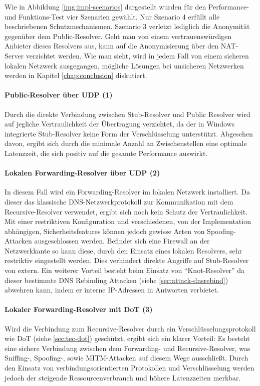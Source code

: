 Wie in Abbildung \ref{img:impl-scenarios} dargestellt wurden für den Performance- und Funktions-Test vier Szenarien gewählt. Nur Szenario 4 erfüllt alle beschriebenen Schutzmechanismen. Szenario 3 verletzt lediglich die Anonymität gegenüber dem Public-Resolver. Geht man von einem vertrauenswürdigen Anbieter dieses Resolvers aus, kann auf die Anonymisierung über den NAT-Server verzichtet werden. Wie man sieht, wird in jedem Fall von einem sicheren lokalen Netzwerk ausgegangen, mögliche Lösungen bei unsicheren Netzwerken werden in Kapitel \ref{chap:conclusion} diskutiert. 

\paragraph{Public-Resolver über UDP (1)}
Durch die direkte Verbindung zwischen Stub-Resolver und Public Resolver wird auf jegliche Vertraulichkeit der Übertragung verzichtet, da der in Windows integrierte Stub-Resolver keine Form der Verschlüsselung unterstützt. Abgesehen davon, ergibt sich durch die minimale Anzahl an Zwischenstellen eine optimale Latenzzeit, die sich positiv auf die gesamte Performance auswirkt.

\paragraph{Lokalen Forwarding-Resolver über UDP (2)}
In diesem Fall wird ein Forwarding-Resolver im lokalen Netzwerk installiert. Da dieser das klassische DNS-Netzwerkprotokoll zur Kommunikation mit dem Recursive-Resolver verwendet, ergibt sich noch kein Schutz der Vertraulichkeit. Mit einer restriktiven Konfiguration und verschiedenen, von der Implementation abhängigen, Sicherheitsfeatures können jedoch gewisse Arten von Spoofing-Attacken ausgeschlossen werden. Befindet sich eine Firewall an der Netzwerkkante so kann diese, durch den Einsatz eines lokalen Resolvers, sehr restriktiv eingestellt werden. Dies verhindert direkte Angriffe auf Stub-Resolver von extern. Ein weiterer Vorteil besteht beim Einsatz von ``Knot-Resolver'' da dieser bestimmte DNS Rebinding Attacken (siehe \ref{sec:attack-dnsrebind}) abwehren kann, indem er interne IP-Adressen in Antworten verbietet\cite{KnotResolverDocRebinding}.

\paragraph{Lokaler Forwarding-Resolver mit DoT (3)}
Wird die Verbindung zum Recursive-Resolver durch ein Verschlüsselungsprotokoll wie DoT (siehe \ref{sec:tec-dot}) geschützt, ergibt sich ein klarer Vorteil: Es besteht eine sichere Verbindung zwischen dem Forwarding- und Recursive-Resolver, was Sniffing-, Spoofing-, sowie MITM-Attacken auf diesem Wege ausschließt. Durch den Einsatz von verbindungsorientierten Protokollen und Verschlüsselung werden jedoch der steigende Ressourcenverbrauch und höhere Latenzzeiten merkbar.

